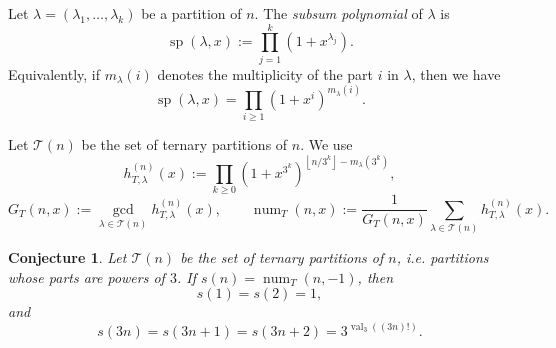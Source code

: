 \documentclass[12pt]{amsart}
\newtheorem{conjecture}{Conjecture}
\DeclareMathOperator{\spol}{sp}
\DeclareMathOperator{\num}{num}
\newcommand{\floor}[1]{\left\lfloor #1\right\rfloor}
\newcommand{\TT}{\mathcal T}
\begin{document}
Let \(\lambda=(\lambda_1,\ldots,\lambda_k)\) be a partition of \(n\).  The
\emph{subsum polynomial} of \(\lambda\) is
\begin{equation}
   \spol(\lambda,x):=\prod_{j=1}^k(1+x^{\lambda_j}).
\end{equation}
Equivalently, if \(m_\lambda(i)\) denotes the multiplicity of the part \(i\) in
\(\lambda\), then we have
\[
   \spol(\lambda,x)=\prod_{i\ge1}(1+x^i)^{m_\lambda(i)}.
\]

Let \(\TT(n)\) be the set of ternary partitions of \(n\).  We use
\[
   h_{T,\lambda}^{(n)}(x)
   :=\prod_{k\ge0}(1+x^{3^k})^{\floor{n/3^k}-m_\lambda(3^k)},
\]
\[
   G_T(n,x):=\gcd_{\lambda\in\TT(n)}h_{T,\lambda}^{(n)}(x),
   \qquad
   \num_T(n,x):=\frac{1}{G_T(n,x)}
      \sum_{\lambda\in\TT(n)}h_{T,\lambda}^{(n)}(x).
\]

\begin{conjecture}\label{conj:conj9} Let \(\TT(n)\) be the set of ternary partitions of \(n\), i.e. partitions
whose parts are powers of \(3\).  If \(s(n)=\num_T(n,-1)\), then
\[
   s(1)=s(2)=1,
\]
and
\[
   s(3n)=s(3n+1)=s(3n+2)=3^{\operatorname{val}_3((3n)!)}.
\]
\end{conjecture}
\end{document}
